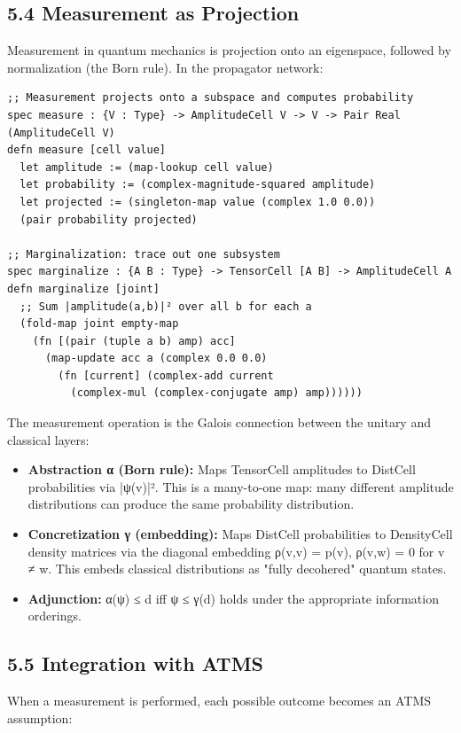 \documentclass[11pt]{article}
\begin{document}
\subsection{5.4 Measurement as Projection}
\label{sec:orga39f79d}

Measurement in quantum mechanics is projection onto an eigenspace, followed by
normalization (the Born rule). In the propagator network:

\begin{verbatim}
;; Measurement projects onto a subspace and computes probability
spec measure : {V : Type} -> AmplitudeCell V -> V -> Pair Real (AmplitudeCell V)
defn measure [cell value]
  let amplitude := (map-lookup cell value)
  let probability := (complex-magnitude-squared amplitude)
  let projected := (singleton-map value (complex 1.0 0.0))
  (pair probability projected)

;; Marginalization: trace out one subsystem
spec marginalize : {A B : Type} -> TensorCell [A B] -> AmplitudeCell A
defn marginalize [joint]
  ;; Sum |amplitude(a,b)|² over all b for each a
  (fold-map joint empty-map
    (fn [(pair (tuple a b) amp) acc]
      (map-update acc a (complex 0.0 0.0)
        (fn [current] (complex-add current
          (complex-mul (complex-conjugate amp) amp))))))
\end{verbatim}

The measurement operation is the Galois connection between the unitary and
classical layers:

\begin{itemize}
\item \textbf{Abstraction α (Born rule):} Maps TensorCell amplitudes to DistCell
probabilities via |ψ(v)|². This is a many-to-one map: many different amplitude
distributions can produce the same probability distribution.
\item \textbf{Concretization γ (embedding):} Maps DistCell probabilities to DensityCell
density matrices via the diagonal embedding ρ(v,v) = p(v), ρ(v,w) = 0 for
v ≠ w. This embeds classical distributions as "fully decohered" quantum states.
\item \textbf{Adjunction:} α(ψ) ≤ d iff ψ ≤ γ(d) holds under the appropriate information
orderings.
\end{itemize}
\subsection{5.5 Integration with ATMS}
\label{sec:org579be9f}

When a measurement is performed, each possible outcome becomes an ATMS assumption:
\end{document}
